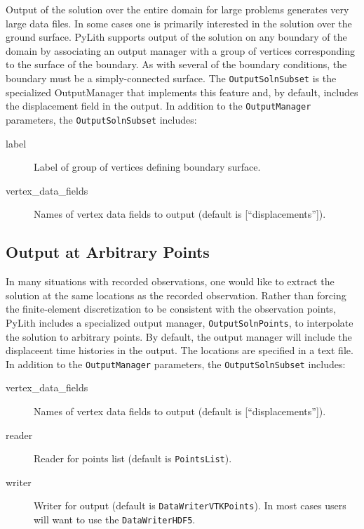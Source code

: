 Output of the solution over the entire domain for large problems generates
very large data files. In some cases one is primarily interested in
the solution over the ground surface. PyLith supports output of the
solution on any boundary of the domain by associating an output manager
with a group of vertices corresponding to the surface of the boundary.
As with several of the boundary conditions, the boundary must be a
simply-connected surface. The \texttt{OutputSolnSubset} is the specialized
OutputManager that implements this feature and, by default, includes
the displacement field in the output. In addition to the \texttt{OutputManager}
parameters, the \texttt{OutputSolnSubset} includes:
\begin{description}
\item [{label}] Label of group of vertices defining boundary surface.
\item [{vertex\_data\_fields}] Names of vertex data fields to output (default
is {[}``displacements''{]}).
\end{description}

\subsection{\label{sec:output:points}Output at Arbitrary Points}

In many situations with recorded observations, one would like to extract
the solution at the same locations as the recorded observation. Rather
than forcing the finite-element discretization to be consistent with
the observation points, PyLith includes a specialized output manager,
\texttt{OutputSolnPoints}, to interpolate the solution to arbitrary
points. By default, the output manager will include the displaceent
time histories in the output. The locations are specified in a text
file. In addition to the \texttt{OutputManager} parameters, the \texttt{OutputSolnSubset}
includes:
\begin{description}
\item [{vertex\_data\_fields}] Names of vertex data fields to output (default
is {[}``displacements''{]}).
\item [{reader}] Reader for points list (default is \texttt{PointsList}).
\item [{writer}] Writer for output (default is \texttt{DataWriterVTKPoints}).
In most cases users will want to use the \texttt{} \linebreak{}
\texttt{DataWriterHDF5}.
\end{description}

